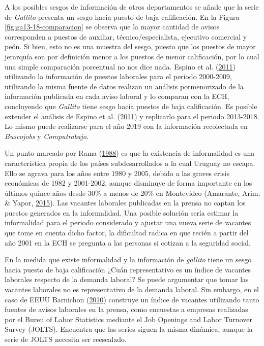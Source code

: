 \documentclass[12pt,oneside]{reedthesis}
\begin{document}
A los posibles sesgos de información de otros departamentos se añade que la serie de \emph{Gallito} presenta un sesgo hacia puesto de baja calificación. En la Figura \ref{fig:ga13-18-comparacion} se observa que la mayor cantidad de avisos corresponden a puestos de auxiliar, técnico/especialista, ejecutivo comercial y peón. Si bien, esto no es una muestra del sesgo, puesto que los puestos de mayor jerarquía son por definición menor a los puestos de menor calificación, por lo cual una simple comparación porcentual no nos dice nada. Espino et al. (\protect\hyperlink{ref-Alma2011}{2011}) utilizando la información de puestos laborales para el periodo 2000-2009, utilizando la misma fuente de datos realizan un análisis pormenorizado de la información publicada en cada aviso laboral y lo comparan con la ECH, concluyendo que \emph{Gallito} tiene sesgo hacia puestos de baja calificación. Es posible extender el análisis de Espino et al. (\protect\hyperlink{ref-Alma2011}{2011}) y replicarlo para el periodo 2013-2018. Lo mismo puede realizarse para el año 2019 con la información recolectada en \emph{Buscojobs} y \emph{Computrabajo}.

Un punto marcado por Rama (\protect\hyperlink{ref-Rama1988}{1988}) es que la existencia de informalidad es una característica propia de los países subdesarrollados a la cual Uruguay no escapa. Ello se agrava para los años entre 1980 y 2005, debido a las graves crisis económicas de 1982 y 2001-2002, aunque disminuye de forma importante en los últimos quince años desde 30\% a menos de 20\% en Montevideo (Amarante, Arim, \& Yapor, \protect\hyperlink{ref-Amarante2015}{2015}). Las vacantes laborales publicadas en la prensa no captan los puestos generados en la informalidad. Una posible solución sería estimar la informalidad para el periodo considerado y ajustar una nueva serie de vacantes que tome en cuenta dicho factor, la dificultad radica en que recién a partir del año 2001 en la ECH se pregunta a las personas si cotizan a la seguridad social.

En la medida que existe informalidad y la información de \emph{gallito} tiene un sesgo hacia puesto de baja calificación ¿Cuán representativo es un índice de vacantes laborales respecto de la demanda laboral? Se puede argumentar que tomar las vacantes laborales no es representativo de la demanda laboral. Sin embargo, en el caso de EEUU Barnichon (\protect\hyperlink{ref-Barnichon2010}{2010}) construye un índice de vacantes utilizando tanto fuentes de avisos laborales en la prensa, como encuestas a empresas realizadas por el Bureu of Labor Statistics mediante el Job Openings and Labor Turnover Survey (JOLTS). Encuentra que las series siguen la misma dinámica, aunque la serie de JOLTS necesita ser reescalado.
\end{document}

